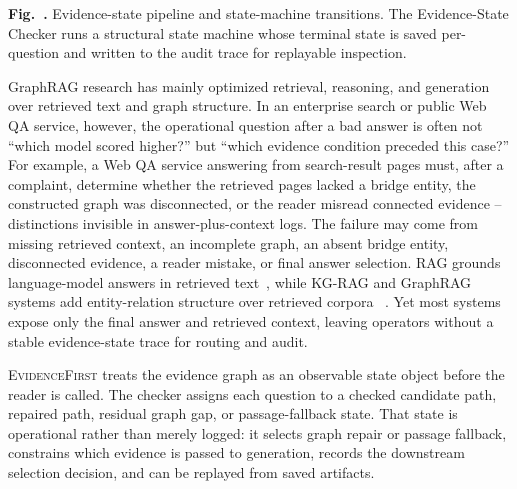 \documentclass[runningheads,a4paper]{llncs}
\newcommand{\sys}{\textsc{EvidenceFirst}\xspace}
\begin{document}
\begin{center}
\parbox{\linewidth}{\scriptsize\textbf{Fig.~\thefigure.}
Evidence-state pipeline and state-machine transitions. The Evidence-State
Checker runs a structural state machine whose terminal state is saved
per-question and written to the audit trace for replayable inspection.}
\vspace{-4pt}
\end{center}

GraphRAG research has mainly optimized retrieval, reasoning, and generation
over retrieved text and graph structure. In an enterprise search or public Web
QA service, however, the operational question after a bad answer is often not
``which model scored higher?'' but ``which evidence condition preceded this
case?'' For example, a Web QA service answering from search-result pages must,
after a complaint, determine whether the retrieved pages lacked a bridge entity,
the constructed graph was disconnected, or the reader misread connected evidence
-- distinctions invisible in answer-plus-context logs. The failure may come from
missing retrieved context, an incomplete graph,
an absent bridge entity, disconnected evidence, a reader mistake, or final
answer selection. RAG grounds language-model answers in retrieved
text~\cite{lewis2020rag}, while KG-RAG and GraphRAG systems add
entity-relation structure over retrieved corpora
~\cite{edge2024graphrag,guo2024lightrag,han2025graphragsurvey}. Yet most
systems expose only the final answer and retrieved context, leaving operators
without a stable evidence-state trace for routing and audit.

\sys treats the evidence graph as an observable state object before the reader
is called. The checker assigns each question to a checked candidate path,
repaired path, residual graph gap, or passage-fallback state. That state is
operational rather than merely logged: it selects graph repair or passage
fallback, constrains which evidence is passed to generation, records the
downstream selection decision, and can be replayed from saved artifacts.
\end{document}
